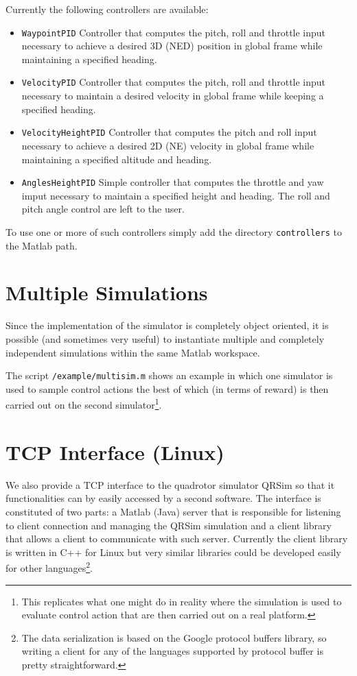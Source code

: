 \documentclass[a4paper,11pt]{report}
\begin{document}
Currently the following controllers are available:
\begin{itemize}
\item \texttt{WaypointPID} Controller that computes the pitch, roll and throttle input necessary to achieve a desired 3D (NED) position in global frame while maintaining a specified heading.
\item \texttt{VelocityPID} Controller that computes the pitch, roll and throttle input necessary to maintain a desired velocity in global frame while keeping a specified heading.
\item \texttt{VelocityHeightPID} Controller that computes the pitch and roll input necessary to achieve a desired 2D (NE) velocity in global frame while maintaining a specified altitude and heading.
\item \texttt{AnglesHeightPID} Simple controller that computes the throttle and yaw imput necessary to maintain a specified height and heading. The roll and pitch angle control are left to the user.
\end{itemize}

To use one or more of such controllers simply add the directory \texttt{controllers} to the Matlab path.

\section{Multiple Simulations}

Since the implementation of the simulator is completely object oriented, it is possible (and sometimes very useful) to instantiate multiple and completely independent simulations within the same Matlab workspace.  

The script \texttt{/example/multisim.m} shows an example in which one simulator is used to sample control actions the best of which (in terms of reward) is then carried out on the second simulator\footnote{This replicates what one might do in reality where the simulation is used to evaluate control action that are then carried out on a real platform.}. 

\section{TCP Interface (Linux)}

We also provide a TCP interface to the quadrotor simulator QRSim so that it functionalities can by easily accessed by a second software. 
The interface is constituted of two parts: a Matlab (Java) server that is responsible for listening to client connection and managing the QRSim simulation and a client library that allows a client to communicate with such server.
Currently the client library is written in C++ for Linux but very similar libraries could be developed easily for other languages\footnote{The data serialization is based on the Google protocol buffers library, so writing a client for any of the languages supported by protocol buffer is pretty straightforward.}.
\end{document}
